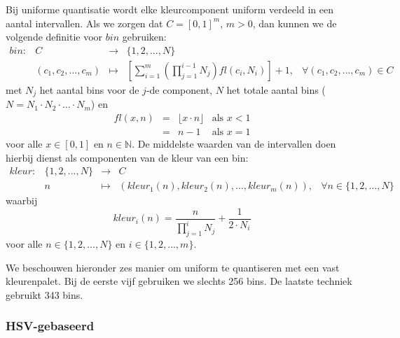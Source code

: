 Bij uniforme quantisatie wordt elke kleurcomponent uniform verdeeld in een aantal intervallen.
Als we zorgen dat $C=[0,1]^m$, $m > 0$, dan kunnen we 
de volgende definitie voor $bin$ gebruiken:
$$
\begin{array}{lrcll}
bin: & C & \to & \{1,2,...,N\}\\[5pt]
     & (c_1,c_2,\ldots,c_m) & \mapsto & \left[ \sum_{i=1}^m \left( \prod_{j=1}^{i-1} N_j \right) \mathit{fl}(c_i, N_i) \right] + 1, & \forall (c_1,c_2,\ldots,c_m) \in C
\end{array}
$$
met $N_j$ het aantal bins voor de $j$-de component, $N$ het totale aantal bins 
($N=N_1 \cdot N_2 \cdot \ldots \cdot N_m$) en
$$
\begin{array}{rcll}
\mathit{fl}(x,n) & = & \lfloor x \cdot n \rfloor & \textrm{als } x < 1 \\
				 & = & n - 1 & \textrm{als } x = 1
\end{array}
$$
voor alle $x \in [0,1]$ en $n \in \mathbb{N}$. De middelste waarden
van de intervallen doen hierbij dienst als componenten van de kleur van een bin:
$$
\begin{array}{lrcll}
kleur: & \{1,2,\ldots,N\} & \to & C \\
	   & n & \mapsto & (kleur_1(n), kleur_2(n), \dots, kleur_m(n)), & \forall n \in \{1,2,\ldots,N\} 
\end{array}
$$
waarbij
$$
kleur_i(n) = \frac{n}{\prod_{j=1}^i N_j} + \frac{1}{2 \cdot N_i}
$$
voor alle $n \in \{1,2,\ldots,N\}$ en $i \in \{1,2,\ldots,m\}$.

We beschouwen hieronder zes manier om uniform te quantiseren met een vast kleurenpalet.  
Bij de eerste vijf gebruiken 
we slechts 256 bins. De laatste techniek gebruikt 343 bins.

\subsubsection{HSV-gebaseerd}

